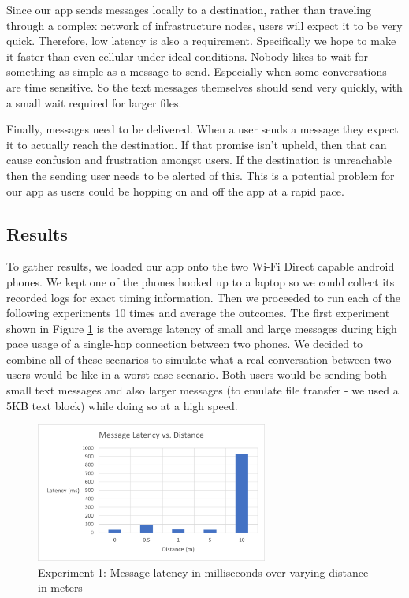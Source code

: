 \documentclass[10pt]{article}
\begin{document}
Since our app sends messages locally to a destination, rather than traveling through a complex network of infrastructure nodes, users will expect it to be very quick. Therefore, low latency is also a requirement. Specifically we hope to make it faster than even cellular under ideal conditions. Nobody likes to wait for something as simple as a message to send. Especially when some conversations are time sensitive. So the text messages themselves should send very quickly, with a small wait required for larger files.

Finally, messages need to be delivered. When a user sends a message they expect it to actually reach the destination. If that promise isn't upheld, then that can cause confusion and frustration amongst users. If the destination is unreachable then the sending user needs to be alerted of this. This is a potential problem for our app as users could be hopping on and off the app at a rapid pace.

\subsection{Results}

To gather results, we loaded our app onto the two Wi-Fi Direct capable android phones. We kept one of the phones hooked up to a laptop so we could collect its recorded logs for exact timing information. Then we proceeded to run each of the following experiments 10 times and average the outcomes. The first experiment shown in Figure \ref{results:message_latency} is the average latency of small and large messages during high pace usage of a single-hop connection between two phones. We decided to combine all of these scenarios to simulate what a real conversation between two users would be like in a worst case scenario. Both users would be sending both small text messages and also larger messages (to emulate file transfer - we used a 5KB text block) while doing so at a high speed.

\begin{figure}[h!]
    \centering
    \includegraphics[width=3in]{message_latency_graph.png}
    \caption{Experiment 1: Message latency in milliseconds over varying distance in meters}
    \label{results:message_latency}
\end{figure}
\end{document}
